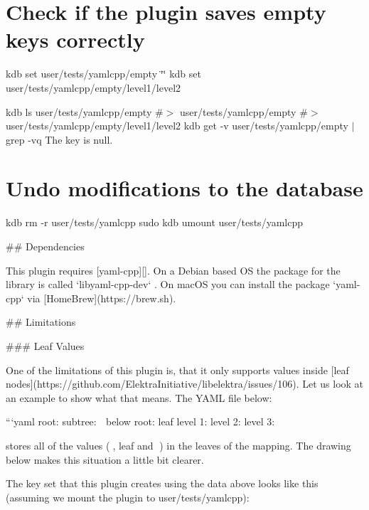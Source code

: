\section*{Check if the plugin saves empty keys correctly}

kdb set user/tests/yamlcpp/empty \char`\"{}\char`\"{} kdb set user/tests/yamlcpp/empty/level1/level2

kdb ls user/tests/yamlcpp/empty \#$>$ user/tests/yamlcpp/empty \#$>$ user/tests/yamlcpp/empty/level1/level2 kdb get -\/v user/tests/yamlcpp/empty $\vert$ grep -\/vq \textquotesingle{}The key is null.\textquotesingle{}

\section*{Undo modifications to the database}

kdb rm -\/r user/tests/yamlcpp sudo kdb umount user/tests/yamlcpp 
\begin{DoxyCode}
## Dependencies

This plugin requires [yaml-cpp][]. On a Debian based OS the package for the library is called
       `libyaml-cpp-dev` . On macOS you can install the package `yaml-cpp` via [HomeBrew](https://brew.sh).

## Limitations

### Leaf Values

One of the limitations of this plugin is, that it only supports values inside [leaf
       nodes](https://github.com/ElektraInitiative/libelektra/issues/106). Let us look at an example to show what that means. The YAML
       file below:

```yaml
root:
  subtree:    🍂
  below root: leaf
level 1:
  level 2:
    level 3:  🍁
\end{DoxyCode}


stores all of the values ({\ttfamily 🍂}, {\ttfamily leaf} and {\ttfamily 🍁}) in the leaves of the mapping. The drawing below makes this situation a little bit clearer.



The key set that this plugin creates using the data above looks like this (assuming we mount the plugin to {\ttfamily user/tests/yamlcpp})\+:

